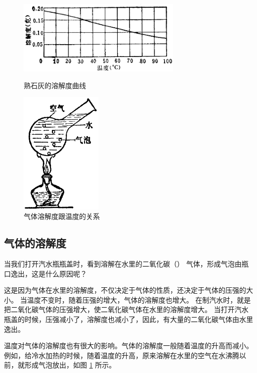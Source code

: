 \begin{figure}[htbp]
    \centering
    \begin{minipage}[b]{9cm}
        \centering
        \includegraphics[width=8cm]{../pic/czhx1-ch4-3}
    \caption{熟石灰的溶解度曲线}\label{fig:4-3}
    \end{minipage}
    \qquad
    \begin{minipage}[b]{5.5cm}
        \centering
        \includegraphics[width=4cm]{../pic/czhx1-ch4-4}
        \caption{气体溶解度跟温度的关系}\label{fig:4-4}
    \end{minipage}
\end{figure}


\subsection{气体的溶解度}

当我们打开汽水瓶瓶盖时，看到溶解在水里的二氧化碳（） 气体，形成气泡由瓶口逸出，这是什么原因呢？

这是因为气体在水里的溶解度，不仅决定于气体的性质，还决定于气体的压强的大小。
当温度不变时，随着压强的增大，气体的溶解度也增大。
在制汽水时，就是把二氧化碳气体的压强增大，使二氧化碳气体在水里的溶解度增大。
当打开汽水瓶盖的时候，压强减小了，溶解度也减小了，因此，有大量的二氧化碳气体由水里逸出。


温度对气体的溶解度也有很大的影响。气体的溶解度一般随着温度的升高而减小。
例如，给冷水加热的时候，随着温度的升高，原来溶解在水里的空气在水沸腾以前，就形成气泡放出，如图 \ref{fig:4-4} 所示。

